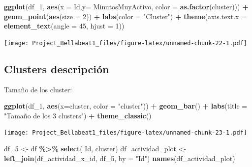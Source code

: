 \documentclass[
]{article}
\newenvironment{Shaded}{\begin{snugshade}}{\end{snugshade}}
\newcommand{\AttributeTok}[1]{\textcolor[rgb]{0.13,0.29,0.53}{#1}}
\newcommand{\DecValTok}[1]{\textcolor[rgb]{0.00,0.00,0.81}{#1}}
\newcommand{\FunctionTok}[1]{\textcolor[rgb]{0.13,0.29,0.53}{\textbf{#1}}}
\newcommand{\NormalTok}[1]{#1}
\newcommand{\OtherTok}[1]{\textcolor[rgb]{0.56,0.35,0.01}{#1}}
\newcommand{\SpecialCharTok}[1]{\textcolor[rgb]{0.81,0.36,0.00}{\textbf{#1}}}
\newcommand{\StringTok}[1]{\textcolor[rgb]{0.31,0.60,0.02}{#1}}
\begin{document}
\begin{Shaded}
\begin{Highlighting}[]
\FunctionTok{ggplot}\NormalTok{(df\_1, }\FunctionTok{aes}\NormalTok{(}\AttributeTok{x =}\NormalTok{ Id,}\AttributeTok{y=}\NormalTok{ MinutosMuyActivo, }\AttributeTok{color =} \FunctionTok{as.factor}\NormalTok{(cluster))) }\SpecialCharTok{+}
  \FunctionTok{geom\_point}\NormalTok{(}\FunctionTok{aes}\NormalTok{(}\AttributeTok{size =} \DecValTok{2}\NormalTok{)) }\SpecialCharTok{+}
  \FunctionTok{labs}\NormalTok{(}\AttributeTok{color =} \StringTok{"Cluster"}\NormalTok{) }\SpecialCharTok{+} \FunctionTok{theme}\NormalTok{(}\AttributeTok{axis.text.x =} \FunctionTok{element\_text}\NormalTok{(}\AttributeTok{angle =} \DecValTok{45}\NormalTok{, }\AttributeTok{hjust =} \DecValTok{1}\NormalTok{))}
\end{Highlighting}
\end{Shaded}

\texttt{[image: Project\_Bellabeat1\_files/figure-latex/unnamed-chunk-22-1.pdf]}

\subsection{Clusters descripción}\label{clusters-descripciuxf3n}

Tamaño de los cluster:

\begin{Shaded}
\begin{Highlighting}[]
\FunctionTok{ggplot}\NormalTok{(df\_1, }\FunctionTok{aes}\NormalTok{(}\AttributeTok{x=}\NormalTok{cluster, }\AttributeTok{color =} \StringTok{"cluster"}\NormalTok{)) }\SpecialCharTok{+} \FunctionTok{geom\_bar}\NormalTok{() }\SpecialCharTok{+} \FunctionTok{labs}\NormalTok{(}\AttributeTok{title =} \StringTok{"Tamaño de los 3 clusters"}\NormalTok{) }\SpecialCharTok{+} \FunctionTok{theme\_classic}\NormalTok{()}
\end{Highlighting}
\end{Shaded}

\texttt{[image: Project\_Bellabeat1\_files/figure-latex/unnamed-chunk-23-1.pdf]}

\begin{Shaded}
\begin{Highlighting}[]
\NormalTok{df\_5 }\OtherTok{\textless{}{-}}\NormalTok{ df }\SpecialCharTok{\%\textgreater{}\%} \FunctionTok{select}\NormalTok{( Id, cluster)}
\NormalTok{df\_actividad\_plot }\OtherTok{\textless{}{-}} \FunctionTok{left\_join}\NormalTok{(df\_actividad\_x\_id, df\_5, }\AttributeTok{by =} \StringTok{"Id"}\NormalTok{)}
\FunctionTok{names}\NormalTok{(df\_actividad\_plot)}
\end{Highlighting}
\end{Shaded}
\end{document}
